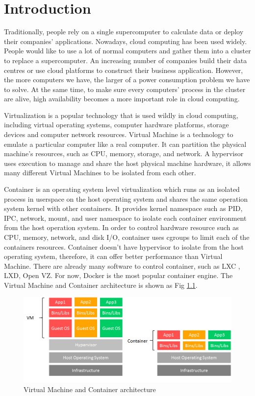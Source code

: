 \chapter{Introduction}
\label{chap:intro}
Traditionally, people rely on a single supercomputer to calculate data or deploy their companies' applications. Nowadays, cloud computing has been used widely. People would like to use a lot of normal computers and gather them into a cluster to replace a supercomputer. An increasing number of companies build their data centres or use cloud platforms to construct their business application.
However, the more computers we have, the larger of a power consumption problem we have to solve. At the same time, to make sure every computers' process in the cluster are alive, high availability becomes a more important role in cloud computing.

Virtualization is a popular technology that is used wildly in cloud computing, including virtual operating systems, computer hardware platforms, storage devices and computer network resources.
Virtual Machine is a technology to emulate a particular computer like a real computer. It can partition the physical machine's resources, such as CPU, memory, storage, and network.
A hypervisor uses execution to manage and share the host physical machine hardware, it allows many different Virtual Machines to be isolated from each other.

Container is an operating system level virtualization which runs as an isolated process in userspace on the host operating system and shares the same operation system kernel with other containers.
It provides kernel namespace such as PID, IPC, network, mount, and user namespace to isolate each container environment from the host operation system.
In order to control hardware resource such as CPU, memory, network, and disk I/O, container uses cgroups to limit each of the containers resources.
Container doesn't have hypervisor to isolate from the host operating system, therefore, it can offer better performance than Virtual Machine. There are already many software to control container, such as LXC \cite{helsley2009lxc}, LXD, Open VZ. For now, Docker \cite{Docker} is the most popular container engine. The Virtual Machine and Container architecture is shown as Fig \ref{fig:VM_vs_container}.

\begin{figure}[h]
\begin{center}
\includegraphics[width=15cm]{figure/VM_vs_container.png}
\end{center}
\caption{Virtual Machine and Container architecture}
\label{fig:VM_vs_container}
\end{figure}

